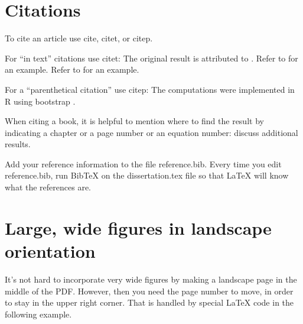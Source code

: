 \section{Citations}


To cite an article use cite, citet, or citep.

For ``in text'' citations use citet:  The original result is attributed to \citet{vn28}.
Refer to \citet{mardia70} for an example.
Refer to \cite{mardia70} for an example.

For a ``parenthetical citation'' use citep:  The computations were implemented in R \citep{R}
using bootstrap \citep{dh97,et93}.

When citing a book, it is helpful to mention where to find the result by indicating
a chapter or a page number or an equation number:  \citet[Ch.~6]{et93} discuss additional results.

Add your reference information to the file reference.bib.
Every time you edit reference.bib, run BibTeX on the dissertation.tex file so that LaTeX will know what the references are.


\section{Large, wide figures in landscape orientation}

It's not hard to incorporate very wide figures by making a landscape page in the middle of the PDF.  However, then you need the page number to move, in order to stay in the upper right corner.  That is handled by special LaTeX code in the following example.

